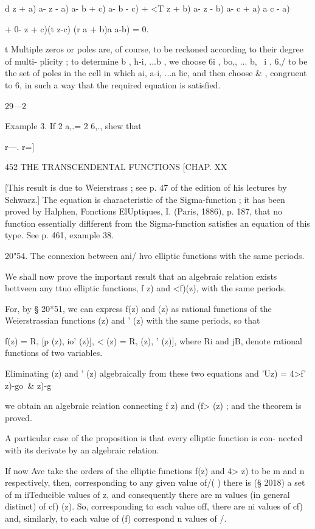 {d z + a) a- z - a) a- b + c) a- b - c) + <T z + b) a- z - b) a- c + a)
a c - a)

+ 0- z + c)(t z-c) (r a + b)a a-b) = 0.

t Multiple zeros or poles are, of course, to be reckoned according to
their degree of multi- plicity ; to determine b , h-i, ...b , we
choose 6i , bo,, ... b, \ i , 6,/ to be the set of poles in the cell
in which ai, a-i, ...a lie, and then choose \& , congruent to 6, in
such a way that the required equation is satisfied.

29—2



Example 3. If 2 a,.= 2 6,., shew that

r—. r=]



452 THE TRANSCENDENTAL FUNCTIONS [CHAP. XX

[This result is due to Weierstrass ; see p. 47 of the edition of his
lectures by Schwarz.] The equation is characteristic of the
Sigma-function ; it has been proved by Halphen, Fonctions ElUptiques,
I. (Paris, 1886), p. 187, that no function essentially diflferent from
the Sigma-function satisfies an equation of this type. See p. 461,
example 38.

20"54. The connexion between ani/ hvo elliptic functions with the same
periods.

We shall now prove the important result that an algebraic relation
exists bettveen any ttuo elliptic functions, f z) and <f)(z), with the
same periods.

For, by § 20*51, we can express f(z) and (z) as rational functions of
the Weierstrassian functions (z) and ' (z) with the same periods, so
that

f(z) = R, [p (z), io' (z)], < (z) = R, (z), ' (z)], where Ri and jB,
denote rational functions of two variables.

Eliminating (z) and ' (z) algebraically from these two equations and
'Uz) = 4>f' z)-go\ \& z)-g

we obtain an algebraic relation connecting f z) and (f> (z) ; and the
theorem is proved.

A particular case of the proposition is that every elliptic function
is con- nected with its derivate by an algebraic relation.

If now Ave take the orders of the elliptic functions f(z) and 4> z) to
be m and n respectively, then, corresponding to any given value of/( )
there is (§ 2018) a set of m iiTeducible values of z, and consequently
there are m values (in general distinct) of cf) (z). So, corresponding
to each value off, there are ni values of cf) and, similarly, to each
value of (f) correspond n values of /.

}
